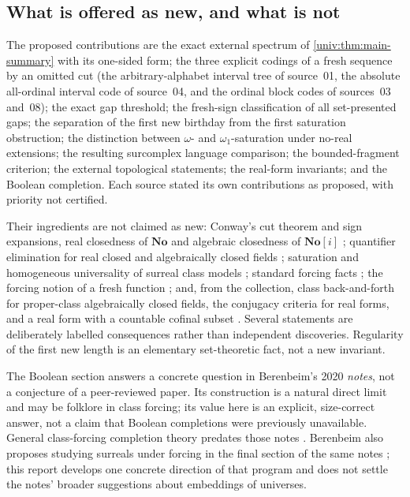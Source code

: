 \documentclass[11pt,letterpaper]{article}
\numberwithin{equation}{section}
\theoremstyle{definition}
\theoremstyle{remark}
\newcommand{\No}{\mathbf{No}}
\begin{document}
\subsection{What is offered as new, and what is not}\label{univ:sub:new}

The proposed contributions are the exact external spectrum of
\cref{univ:thm:main-summary} with its one-sided form; the three explicit
codings of a fresh sequence by an omitted cut (the arbitrary-alphabet interval
tree of source~01, the absolute all-ordinal interval code of source~04, and
the ordinal block codes of sources~03 and~08); the exact gap threshold; the
fresh-sign classification of all set-presented gaps; the separation of the
first new birthday from the first saturation obstruction; the distinction
between $\omega$- and $\omega_1$-saturation under no-real extensions; the
resulting surcomplex language comparison; the bounded-fragment criterion; the
external topological statements; the real-form invariants; and the Boolean
completion. Each source stated its own contributions as proposed, with
priority not certified.

Their ingredients are not claimed as new: Conway's cut theorem and sign
expansions, real closedness of $\No$ and algebraic closedness of $\No[i]$
\cite{Conway,Gonshor}; quantifier elimination for real closed and
algebraically closed fields \cite{Marker}; saturation and homogeneous
universality of surreal class models \cite{Ehrlich1989,vdDE2018}; standard
forcing facts \cite{Jech,Prikry,Gitik,Benhamou}; the forcing notion of a fresh
function \cite{FKW}; and, from the collection, class back-and-forth for
proper-class algebraically closed fields, the conjugacy criteria for real
forms, and a real form with a countable cofinal subset
\cite{RepoAutomorphisms}. Several statements are deliberately labelled
consequences rather than independent discoveries. Regularity of the first new
length is an elementary set-theoretic fact, not a new invariant.

The Boolean section answers a concrete question in Berenbeim's 2020
\emph{notes}, not a conjecture of a peer-reviewed paper. Its construction is
a natural direct limit and may be folklore in class forcing; its value here is
an explicit, size-correct answer, not a claim that Boolean completions were
previously unavailable. General class-forcing completion theory predates
those notes \cite{HolyEtAl}. Berenbeim also proposes studying surreals under
forcing in the final section of the same notes \cite[pp.~32, 34]{Berenbeim};
this report develops one concrete direction of that program and does not
settle the notes' broader suggestions about embeddings of universes.
\end{document}
